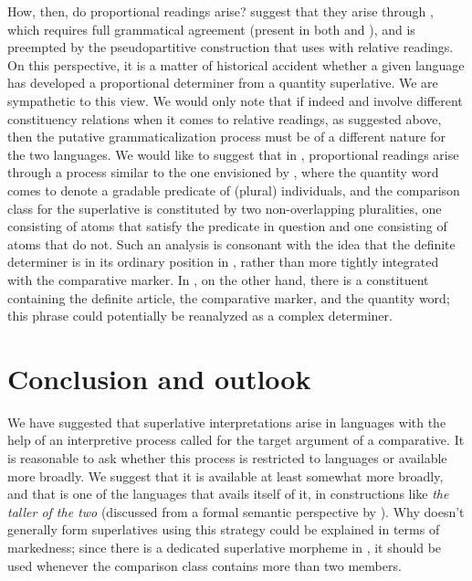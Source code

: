 \documentclass[output=paper
,modfonts
,nonflat]{langsci/langscibook}
\begin{document}
How, then, do proportional readings arise? \citet{Dobrovie-SorinGiurgea2015} suggest that they arise through , which requires full grammatical agreement (present in both  and ), and is preempted by the pseudopartitive construction that  uses with relative readings. On this perspective, it is a matter of historical accident whether a given language has developed a proportional determiner from a quantity superlative. We are sympathetic to this view. We would only note that if indeed  and  involve different constituency relations when it comes to relative readings, as suggested above, then the putative grammaticalization process must be of a different nature for the two languages. We would like to suggest that in , proportional readings arise through a process similar to the one envisioned by \citet{Hoeksema1983}, where the quantity word comes to denote a gradable predicate of (plural) individuals, and the comparison class for the superlative is constituted by two non-overlapping pluralities, one consisting of atoms that satisfy the predicate in question and one consisting of atoms that do not. Such an analysis is consonant with the idea that the definite determiner is in its ordinary position in , rather than more tightly integrated with the comparative marker. In , on the other hand, there is a constituent containing the definite article, the comparative marker, and the quantity word; this phrase could potentially be reanalyzed as a complex determiner.


\section{Conclusion and outlook}

We have suggested that superlative interpretations arise in  languages with the help of an interpretive process called  for the target argument of a comparative. It is reasonable to ask whether this process is restricted to  languages or available more broadly. We suggest that it is available at least somewhat more broadly, and that  is one of the languages that avails itself of it, in constructions like \textit{the taller of the two} (discussed from a formal semantic perspective by \citealt{Szabolcsi2012}). Why  doesn't generally form superlatives using this strategy could be explained in terms of markedness; since there is a dedicated superlative morpheme in , it should be used whenever the comparison class contains more than two members.
\end{document}

